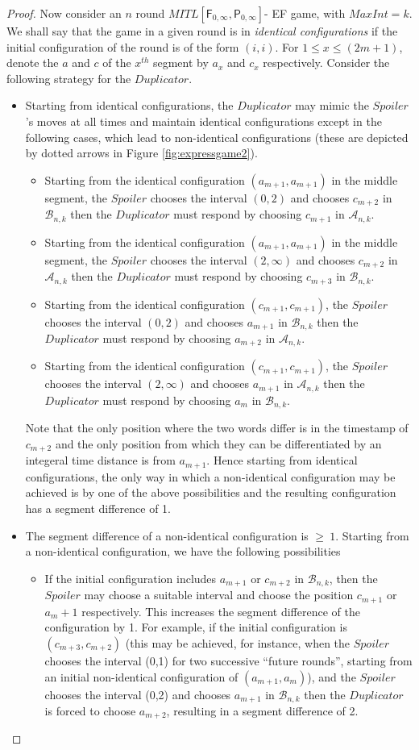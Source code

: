\documentclass{llncs}
\newcommand{\fut}{\textsf{F}}
\newcommand{\past}{\textsf{P}}
\newcommand{\ssp}{\mbox{$\mathit{Spoiler}$}}
\newcommand{\ddp}{\mbox{$\mathit{Duplicator}$}}
\newcommand{\aaa}{\mathcal A}
\newcommand{\bbb}{\mathcal B}
\newcommand{\maxint}{\mbox{$\mathit{MaxInt}$}}
\newcommand{\mitlfpzinf}{\mbox{$\mathit{MITL[\fut_{0,\infty},\past_{0,\infty}]}$}}
\begin{document}
\begin{proof}
Now consider an $n$ round \mitlfpzinf- EF game, with $\maxint =k$. We shall say that the game in a given round is in \emph{identical configurations} if the initial configuration of the round is of the form $(i,i)$. For $1\leq x\leq (2m+1)$, denote the $a$ and $c$ of the $x^{th}$ segment by $a_x$ and $c_x$ respectively. Consider the following strategy for the \ddp.
\begin{itemize}
\item Starting from identical configurations, the \ddp\/ may mimic the \ssp's moves at all times and maintain identical configurations except in the following cases, which lead to non-identical configurations (these are depicted by dotted arrows in Figure \ref{fig:expressgame2}).
\begin{itemize}
\item Starting from the identical configuration $(a_{m+1},a_{m+1})$ in the middle segment, the \ssp\/ chooses the interval $(0,2)$ and chooses $c_{m+2}$ in $\bbb_{n,k}$ then the \ddp\/ must respond by choosing $c_{m+1}$ in $\aaa_{n,k}$. 
\item Starting from the identical configuration $(a_{m+1},a_{m+1})$ in the middle segment, the \ssp\/ chooses the interval $(2,\infty)$ and chooses $c_{m+2}$ in $\aaa_{n,k}$ then the \ddp\/ must respond by choosing $c_{m+3}$ in $\bbb_{n,k}$.
\item Starting from the identical configuration $(c_{m+1},c_{m+1})$, the \ssp\/ chooses the interval $(0,2)$ and chooses $a_{m+1}$ in $\bbb_{n,k}$ then the \ddp\/ must respond by choosing $a_{m+2}$ in $\aaa_{n,k}$.
\item Starting from the identical configuration $(c_{m+1},c_{m+1})$, the \ssp\/ chooses the interval $(2,\infty)$ and chooses $a_{m+1}$ in $\aaa_{n,k}$ then the \ddp\/ must respond by choosing $a_{m}$ in $\bbb_{n,k}$.
\end{itemize}
Note that the only position where the two words differ is in the timestamp of $c_{m+2}$ and the only position from which they can be differentiated by an integeral time distance is from $a_{m+1}$. Hence starting from identical configurations, the only way in which a non-identical configuration may be achieved is by one of the above possibilities and the resulting configuration has a segment difference of 1.
\item The segment difference of a non-identical configuration is $\geq ~1$. Starting from a non-identical configuration, we have the following possibilities
\begin{itemize}
\item If the initial configuration includes $a_{m+1}$ or $c_{m+2}$ in $\bbb_{n,k}$, then the \ssp\/ may choose a suitable interval and choose the position $c_{m+1}$ or ${a_m+1}$ respectively. This increases the segment difference of the configuration by 1. For example, if the initial configuration is $(c_{m+3},c_{m+2})$ (this may be achieved, for instance, when the \ssp\/ chooses the interval (0,1) for two successive ``future rounds'', starting from an initial non-identical configuration of $(a_{m+1},a_m)$), and the \ssp\/ chooses the interval (0,2) and chooses $a_{m+1}$ in $\bbb_{n,k}$ then the \ddp\/ is forced to choose $a_{m+2}$, resulting in a segment difference of 2.

\end{itemize}
\end{itemize}
\end{proof}
\end{document}
